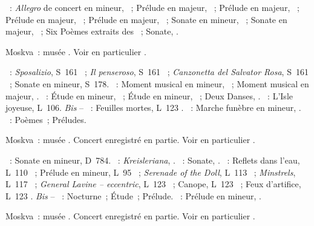 \begin{description}
 \textsc{\Scriabine{}}~: \emph{Allegro} de concert en \kB \Flat mineur,
 ~; Prélude en \kB \Flat majeur,  ~; Prélude en
 \kD \Flat majeur,  ~; Prélude en \kD \Flat majeur,
  ~; Prélude en \kF \Sharp majeur, 
 ~; Sonate en \kF \Sharp mineur, ~; Sonate en \kF \Sharp
 majeur, ~; Six Poèmes extraits des ~;
 Sonate, .
 \item[\DateWithWeekDay{1956-05-12}]
 Moskva~: musée \Scriabine{}.
 Voir en particulier \citet[p.~449]{Milshteyn82a}.

 \textsc{\Liszt{}}~: \emph{Sposalizio}, S~161 ~; \emph{Il
 penseroso}, S~161 ~; \emph{Canzonetta del Salvator Rosa}, S~161
 ~; Sonate en \kB mineur, S~178.
 \textsc{\Rachmaninov{}}~: Moment musical en \kE \Flat mineur, 
 ~; Moment musical en \kD \Flat majeur,  .
 \textsc{\Scriabine{}}~: Étude en \kB \Flat mineur,  ~;
 Étude en \kB \Flat mineur,  ~; Deux Danses, .
 \textsc{\Debussy{}}~: L'\hbox{Isle} joyeuse, L~106.
 \emph{Bis} -- \textsc{\Debussy{}}~: Feuilles mortes, L~123 .
 \textsc{\Medtner{}}~: Marche funèbre en \kB mineur,  .
 \textsc{\Scriabine{}}~: Poèmes~; Préludes.
 \item[\DateWithWeekDay{1956-05-31}]
 Moskva~: musée \Scriabine{}.
 Concert enregistré en partie.
 Voir en particulier \citet[p.~449]{Milshteyn82a}.

 \textsc{\Schubert{}}~: Sonate en \kA mineur, D~784.
 \textsc{\Schumann{}}~: \emph{Kreisleriana}, .
 \textsc{\Scriabine{}}~: Sonate, .
 \textsc{\Debussy{}}~: Reflets dans l'eau, L~110 ~; Prélude en \kA
 mineur, L~95 ~; \emph{Serenade of the Doll}, L~113 ~;
 \emph{Minstrels}, L~117 ~; \emph{General Lavine -- eccentric},
 L~123 ~; Canope, L~123 ~; Feux d'artifice, L~123
 .
 \emph{Bis} -- \textsc{\Chopin{}}~: Nocturne~; Étude~; Prélude.
 \textsc{\Scriabine{}}~: Prélude en \kE \Flat mineur,  .
 \item[\DateWithWeekDay{1956-06-14}]
 Moskva~: musée \Scriabine{}.
 Concert enregistré en partie.
 Voir en particulier \citet[p.~449]{Milshteyn82a}.


\end{description}
